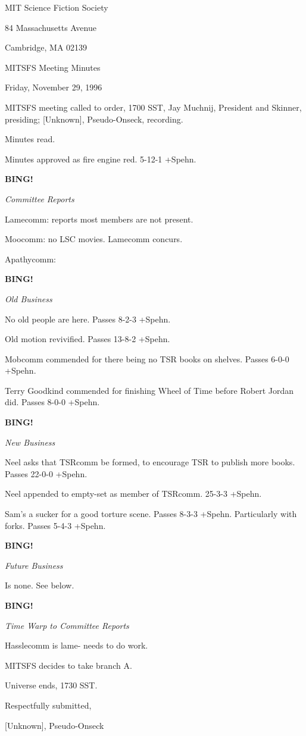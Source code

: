 \documentclass[12pt]{article}
\newcommand{\bing}{{\bf BING!} }
\newcommand{\goto}[1]{\bing \vskip 12pt \centerline{{\em{#1}}}}
\begin{document}
\begin{center}

MIT Science Fiction Society 

84 Massachusetts Avenue

Cambridge, MA 02139

\vspace{12pt}

MITSFS Meeting Minutes 

Friday, November 29, 1996

\end{center}
 
\vspace{18pt}

\setlength{\parskip}{6pt}

\noindent
MITSFS meeting called to order, 1700 SST,
Jay Muchnij, President and Skinner, presiding; [Unknown], Pseudo-Onseck, recording.

Minutes read.

Minutes approved as fire engine red. 5-12-1 +Spehn.

\goto{Committee Reports}

Lamecomm: reports most members are not present.

Moocomm: no LSC movies. Lamecomm concurs.

Apathycomm:

\goto{Old Business}

No old people are here. Passes 8-2-3 +Spehn.

Old motion revivified. Passes 13-8-2 +Spehn.

Mobcomm commended for there being no TSR books on shelves. Passes 6-0-0 +Spehn.

Terry Goodkind commended for finishing Wheel of Time before Robert Jordan did. Passes 8-0-0 +Spehn.

\goto{New Business}

Neel asks that TSRcomm be formed, to encourage TSR to publish more books. Passes 22-0-0 +Spehn.

Neel appended to empty-set as member of TSRcomm. 25-3-3 +Spehn.

Sam's a sucker for a good torture scene. Passes 8-3-3 +Spehn. Particularly with forks. Passes 5-4-3 +Spehn.

\goto{Future Business}

Is none. See below.

\goto{Time Warp to Committee Reports}

Hasslecomm is lame- needs to do work.

MITSFS decides to take branch A.

\vspace{12pt}

\noindent
Universe ends, 1730 SST.

\vspace{18pt}

\centerline{Respectfully submitted,}
\centerline{[Unknown], Pseudo-Onseck}
\end{document}
